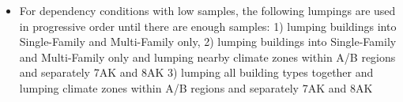 \begin{itemize}
\item For dependency conditions with low samples, the following lumpings are used in progressive order until there are enough samples: 1) lumping buildings into Single-Family and Multi-Family only,  2) lumping buildings into Single-Family and Multi-Family only and lumping nearby climate zones within  A/B regions and separately 7AK and 8AK 3) lumping all building types together and lumping climate zones within A/B regions and separately 7AK and 8AK
\end{itemize}
